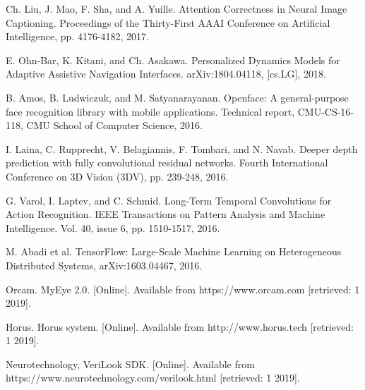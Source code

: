 \documentclass[10pt,conference,compsocconf]{IEEEtran}
\begin{document}
\begin{thebibliography}{99}
 Ch. Liu, J. Mao, F. Sha, and A. Yuille. Attention Correctness in Neural Image Captioning. Proceedings of the Thirty-First AAAI Conference on Artificial Intelligence, pp. 4176-4182, 2017.

 E. Ohn-Bar, K. Kitani, and Ch. Asakawa. Personalized Dynamics Models for Adaptive Assistive Navigation Interfaces. arXiv:1804.04118, [cs.LG], 2018.




 B. Amos, B. Ludwiczuk, and M. Satyanarayanan. Openface: A general-purpose face recognition library with mobile applications. Technical report, CMU-CS-16-118, CMU School of Computer Science, 2016.


 I. Laina, C. Rupprecht, V. Belagiannis, F. Tombari, and N. Navab. Deeper depth prediction with fully convolutional residual networks. Fourth International Conference on 3D Vision (3DV), pp. 239-248, 2016.


 G. Varol, I. Laptev, and C. Schmid. Long-Term Temporal Convolutions for Action Recognition.  IEEE Transactions on Pattern Analysis and Machine Intelligence. Vol. 40, issue 6, pp. 1510-1517, 2016.

 M. Abadi et al. TensorFlow: Large-Scale Machine Learning on Heterogeneous Distributed Systems, arXiv:1603.04467, 2016. 


 Orcam. MyEye 2.0. [Online]. Available from https://www.orcam.com [retrieved: 1 2019].

 Horus. Horus system. [Online]. Available from http://www.horus.tech [retrieved: 1 2019].

 Neurotechnology, VeriLook SDK. [Online]. Available from https://www.neurotechnology.com/verilook.html [retrieved: 1 2019].


\end{thebibliography}




\end{document}
